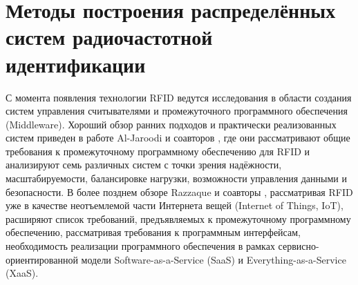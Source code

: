 \section{Методы построения распределённых систем радиочастотной идентификации}

С момента появления технологии RFID ведутся исследования в области создания систем управления считывателями и промежуточного программного обеспечения (Middleware). Хороший обзор ранних подходов и практически реализованных систем приведен в работе Al-Jaroodi и соавторов \cite{Al-Jaroodi2009}, где они рассматривают общие требования к промежуточному программному обеспечению для RFID и анализируют семь различных систем с точки зрения надёжности, масштабируемости, балансировке нагрузки, возможности управления данными и безопасности. В более позднем обзоре Razzaque и соавторы \cite{Razzaque2016}, рассматривая RFID уже в качестве неотъемлемой части Интернета вещей (Internet of Things, IoT), расширяют список требований, предъявляемых к промежуточному программному обеспечению, рассматривая требования к программным интерфейсам, необходимость реализации программного обеспечения в рамках сервисно-ориентированной модели Software-as-a-Service (SaaS) и Everything-as-a-Service (XaaS).

